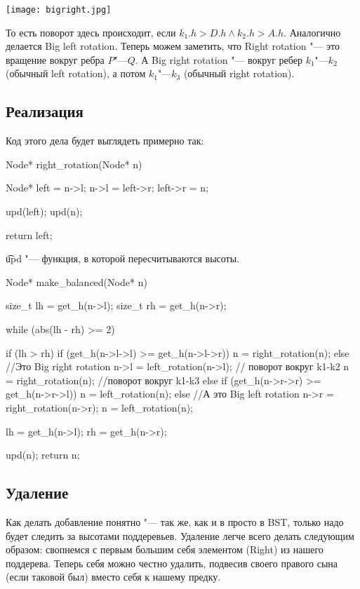 \begin{center} \texttt{[image: bigright.jpg]} \end{center}

То есть поворот здесь происходит, если $k_1.h > D.h \land k_2.h > A.h$.
Аналогично делается Big left rotation.
Теперь можем заметить, что Right rotation "--- это вращение вокруг ребра $P$"---$Q$.
А Big right rotation "--- вокруг ребер $k_1$"---$k_2$ (обычный left rotation), а потом $k_1$"---$k_3$ (обычный right rotation).

\subsection{Реализация}

Код этого дела будет выглядеть примерно так:
\begin{cppcode}
Node* right_rotation(Node* n) {
	Node* left = n->l;
	n->l = left->r;
	left->r = n;

	upd(left); upd(n);

	return left;
}
\end{cppcode}
\t{upd} "--- функция, в которой пересчитываются высоты.

\begin{cppcode}
Node* make_balanced(Node* n) {
	size_t lh = get_h(n->l);
	size_t rh = get_h(n->r);

	while (abs(lh - rh) >= 2) {
		if (lh > rh) {
			if (get_h(n->l->l) >= get_h(n->l->r)) {
				n = right_rotation(n);
			} else { //Это Big right rotation
				n->l = left_rotation(n->l); // поворот вокруг k1-k2
				n = right_rotation(n); //поворот вокруг k1-k3
			}
		} else {
			if (get_h(n->r->r) >= get_h(n->r->l)) {
				n = left_rotation(n);
			} else { //А это Big left rotation
				n->r = right_rotation(n->r);
				n = left_rotation(n);
			}
		}

		lh = get_h(n->l);
		rh = get_h(n->r);
	}

	upd(n);
	return n;
}
\end{cppcode}

\subsection{Удаление}

Как делать добавление понятно "--- так же, как и в просто в BST, только надо будет следить за высотами поддеревьев.
Удаление легче всего делать следующим образом: свопнемся с первым большим себя элементом (Right) из нашего поддерева.
Теперь себя можно честно удалить, подвесив своего правого сына (если таковой был) вместо себя к нашему предку.

